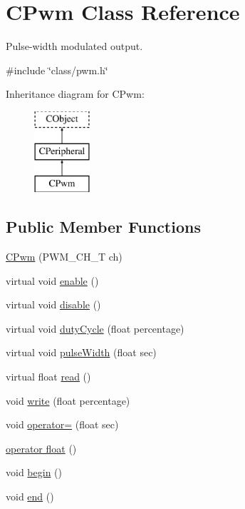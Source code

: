 \hypertarget{class_c_pwm}{\section{C\-Pwm Class Reference}
\label{class_c_pwm}
}


Pulse-\/width modulated output.  




{\ttfamily \#include \char`\"{}class/pwm.\-h\char`\"{}}

Inheritance diagram for C\-Pwm\-:\begin{figure}[H]
\begin{center}
\leavevmode
\includegraphics[height=3.000000cm]{d1/d9f/class_c_pwm}
\end{center}
\end{figure}
\subsection*{Public Member Functions}
\begin{DoxyCompactItemize}
\item 
\hyperlink{class_c_pwm_a53beaa27e8d3982351770f425dffb432}{C\-Pwm} (P\-W\-M\-\_\-\-C\-H\-\_\-\-T ch)
\item 
virtual void \hyperlink{class_c_pwm_a640f06df704cc299e45fafb9c1a1972e}{enable} ()
\item 
virtual void \hyperlink{class_c_pwm_a47c790491c994cc959bf204415be2aeb}{disable} ()
\item 
virtual void \hyperlink{class_c_pwm_ae0cb5e7e45453fb3fc049bada896c151}{duty\-Cycle} (float percentage)
\item 
virtual void \hyperlink{class_c_pwm_ae6ea4c5209e4f1360861371c7bf744e7}{pulse\-Width} (float sec)
\item 
virtual float \hyperlink{class_c_pwm_af69709834f0c179df1a6d8e7ad314930}{read} ()
\item 
void \hyperlink{class_c_pwm_a57cbfceb20e1f2970f45b5d1571431d1}{write} (float percentage)
\item 
void \hyperlink{class_c_pwm_aadc2ad3efd1afe9ae32919462c8286cb}{operator=} (float sec)
\item 
\hyperlink{class_c_pwm_a34dc590715ddb4b118132c69dad1140f}{operator float} ()
\item 
void \hyperlink{class_c_pwm_ae8fdd7f2337005c61ec995196de366de}{begin} ()
\item 
void \hyperlink{class_c_pwm_aea8cdf467fe4d3e1b3c1547dbfbce4ce}{end} ()
\end{DoxyCompactItemize}
